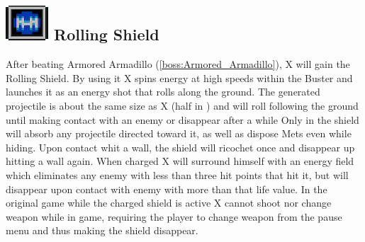 \subsection{\includegraphics[scale=0.2]{figures/X1/Armored_armadillo/Rolling_S.png} Rolling Shield}\label{Rolling_shield}
After beating Armored Armadillo (\ref{boss:Armored_Armadillo}), X will gain the Rolling Shield. By using it X spins energy at high speeds within the Buster and launches it as an energy shot that rolls along the ground. The generated projectile is about the same size as X (half in \mhx) and will roll following the ground until making contact with an enemy or disappear after a while Only in \mhx the shield will absorb any projectile directed toward it, as well as dispose Mets even while hiding\cite{wiki:Rolling_shield}. Upon contact whit a wall, the shield will ricochet once and disappear up hitting a wall again. When charged X will surround himself with an energy field which eliminates any enemy with less than three hit points that hit it, but will disappear upon contact with enemy with more than that life value. In the original game while the charged shield is active X cannot shoot nor change weapon while in game, requiring the player to change weapon from the pause menu and thus making the shield disappear.
